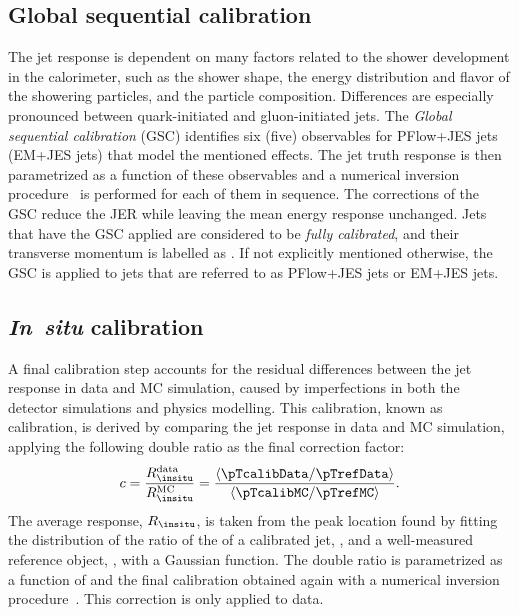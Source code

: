 \subsection{Global sequential calibration}
The jet response is dependent on many factors related to the shower development in the calorimeter, such as the shower shape, the energy distribution and flavor of the showering particles, and the particle composition.
Differences are especially pronounced between quark-initiated and gluon-initiated jets.
The \emph{Global sequential calibration} (GSC) identifies six (five) observables for PFlow+JES jets (EM+JES jets) that model the mentioned effects. The jet truth response is then parametrized as a function of these observables and a numerical inversion procedure~\cite{PERF-2011-03} is performed for each of them in sequence.
The corrections of the GSC reduce the JER while leaving the mean energy response unchanged.
Jets that have the GSC applied are considered to be \emph{fully calibrated}, and their transverse momentum is labelled as \pTcalib. If not explicitly mentioned otherwise, the GSC is applied to jets that are referred to as PFlow+JES jets or EM+JES jets.

\subsection{\textbf{\emph{In~situ}} calibration}
\label{subsec:insitu-calibration}
A final calibration step accounts for the residual differences between the jet response in data and MC simulation, caused by imperfections in both the detector simulations and physics modelling. 
This calibration, known as \emph{\insitu} calibration, is derived by comparing the jet response in data and MC simulation, applying the following double ratio as the final correction factor:
\begin{equation}
    c = \frac{R_{\insitu}^{\text{data}}}{R_{\insitu}^{\text{MC}}} = \frac{ \langle  \pTcalibData / \pTrefData \rangle }{ \langle \pTcalibMC / \pTrefMC \rangle}.
\end{equation}
The average response, $R_{\insitu}$, is taken from the peak location found by fitting the distribution of the ratio of the \pT of a calibrated jet, \pTcalib, and a well-measured reference object, \pTref, with a Gaussian function.
The double ratio is parametrized as a function of \pTref and the final calibration obtained again with a numerical inversion procedure~\cite{PERF-2011-03}.
This correction is only applied to data.


